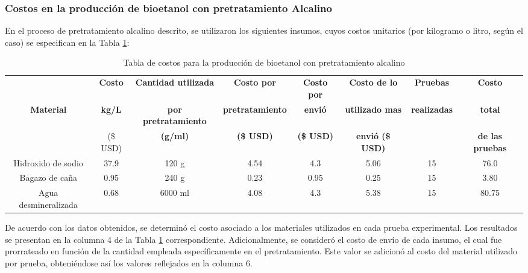 \documentclass[12pt]{article}
\begin{document}
			\subsubsection{Costos en la producción de bioetanol con pretratamiento Alcalino}
			
En el proceso de pretratamiento alcalino descrito, se utilizaron los siguientes insumos, cuyos costos unitarios (por kilogramo o litro, según el caso) se especifican en la Tabla \ref{Costo para pretratamiento alcalino}:


			
				\begin{table}[H]
				\centering
				\caption{Tabla de costos para la producción de bioetanol con pretratamiento alcalino}
				\label{Costo para pretratamiento alcalino}
					\begin{adjustbox}{center=\paperwidth, height=1.5cm}
					\begin{tabular}{|c|c|c|c|c|c|c|c|}
						\hline
									& \textbf{Costo}& \textbf{Cantidad utilizada } &\textbf{Costo por }  &\textbf{Costo por }  & \textbf{Costo de lo }  &\textbf{Pruebas} & \textbf{Costo } \\
					\textbf{Material}&	\textbf{kg/L} & 	\textbf{por pretratamiento} & \textbf{pretratamiento} & \textbf{envió} & \textbf{utilizado mas }  & \textbf{realizadas } & \textbf{total }  \\
								 	& 			(\$ USD)		& \textbf{(g/ml)} &\textbf{	(\$ USD) } &\textbf{(\$ USD)}  & \textbf{envió (\$ USD)} & & \textbf{de las pruebas}\\ \hline		
						Hidroxido de sodio&37.9& 120 g & 4.54& 4.3 & 5.06& 15 &76.0\\ \hline
						Bagazo de caña 	  &0.95& 240 g  &0.23 & 0.95 & 0.25 & 15  &3.80 \\ \hline
						Agua desmineralizada&0.68& 6000 ml& 4.08& 4.3 & 5.38 & 15 & 80.75 \\ \hline
				\end{tabular} 
			\end{adjustbox}
				
			\end{table}
     De acuerdo con los datos obtenidos, se determinó el costo asociado a los materiales utilizados en cada prueba experimental. Los resultados se presentan en la columna 4 de la Tabla \ref{Costo para pretratamiento alcalino} correspondiente. Adicionalmente, se consideró el costo de envío de cada insumo, el cual fue prorrateado en función de la cantidad empleada específicamente en el pretratamiento. Este valor se adicionó al costo del material utilizado por prueba, obteniéndose así los valores reflejados en la columna 6.
\end{document}
